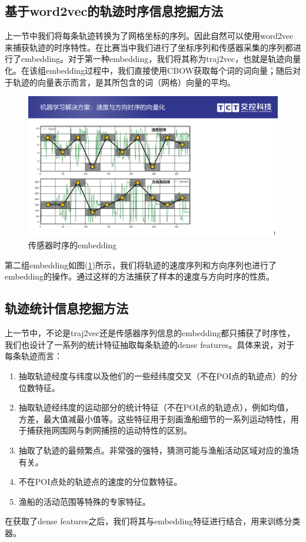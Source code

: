 \documentclass[UTF8, 12pt]{ctexart}
\begin{document}
		\subsection{基于word2vec的轨迹时序信息挖掘方法}
		上一节中我们将每条轨迹转换为了网格坐标的序列。因此自然可以使用word2vec来捕获轨迹的时序特性。在比赛当中我们进行了坐标序列和传感器采集的序列都进行了embedding。对于第一种embedding，我们将其称为traj2vec，也就是轨迹向量化。在该组embedding过程中，我们直接使用CBOW获取每个词的词向量；随后对于轨迹的向量表示而言，是其所包含的词（网格）向量的平均。
		\begin{figure}[H]
			\centering
			\includegraphics[width=0.7\linewidth]{..//plots//sequence_encoding.pdf}
			\caption{传感器时序的embedding}
			\label{sec_2_sequence_encoding}
			\vspace{-0.2cm}
		\end{figure}
		第二组embedding如图(\ref{sec_2_sequence_encoding})所示，我们将轨迹的速度序列和方向序列也进行了embedding的操作。通过这样的方法捕获了样本的速度与方向时序的性质。

		\subsection{轨迹统计信息挖掘方法}
		上一节中，不论是traj2vec还是传感器序列信息的embedding都只捕获了时序性，我们也设计了一系列的统计特征抽取每条轨迹的dense features。具体来说，对于每条轨迹而言：
		\begin{enumerate}
			\item 抽取轨迹经度与纬度以及他们的一些经纬度交叉（不在POI点的轨迹点）的分位数特征。
			\item 抽取轨迹经纬度的运动部分的统计特征（不在POI点的轨迹点），例如均值，方差，最大值减最小值等。这些特征用于刻画渔船细节的一系列运动特性，用于捕获拖网围网与刺网捕捞的运动特性的区别。
			\item 抽取了轨迹的最频繁点。非常强的强特，猜测可能与渔船活动区域对应的渔场有关。
			\item 不在POI点处的轨迹点的速度的分位数特征。
			\item 渔船的活动范围等特殊的专家特征。
		\end{enumerate}
		在获取了dense features之后，我们将其与embedding特征进行结合，用来训练分类器。
\end{document}
